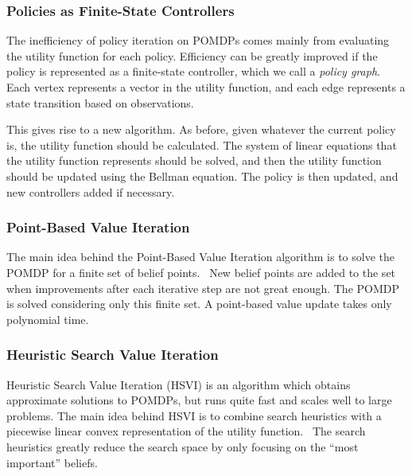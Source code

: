\documentclass[tog]{acmsiggraph}
\begin{document}
\subsubsection{Policies as Finite-State Controllers}
The inefficiency of policy iteration on POMDPs comes mainly from evaluating the utility 
function for each policy. Efficiency can be greatly improved if the policy is represented 
as a finite-state controller, which we call a \textit{policy graph}.~\cite{hansen1998solving} 
Each vertex represents a vector in the utility function, and each edge represents a state 
transition based on observations.

This gives rise to a new algorithm. As before, given whatever the current policy is, the 
utility function should be calculated. The system of linear equations that the utility function 
represents should be solved, and then the utility function should be updated using the Bellman 
equation. The policy is then updated, and new controllers added if necessary.

\subsubsection{Point-Based Value Iteration}
The main idea behind the Point-Based Value Iteration algorithm is to solve the POMDP for a finite 
set of belief points.~\cite{pineau2003point} New belief points are added to the set when improvements 
after each iterative step are not great enough. The POMDP is solved considering only this finite 
set. A point-based value update takes only polynomial time.

\subsubsection{Heuristic Search Value Iteration}
Heuristic Search Value Iteration (HSVI) is an algorithm which obtains approximate solutions to POMDPs, 
but runs quite fast and scales well to large problems. The main idea behind HSVI is to combine search 
heuristics with a piecewise linear convex representation of the utility function.~\cite{smith2004heuristic} 
The search heuristics greatly reduce the search space by only focusing on the ``most important'' beliefs.


\nocite{*}

\end{document}
